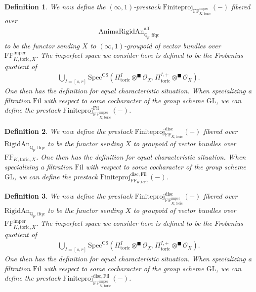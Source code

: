 \documentclass[12pt]{article}
\newtheorem{definition}{Definition}
\begin{document}
\begin{definition}
We now define the $(\infty,1)$-prestack $\mathrm{Finiteproj}_{\mathrm{FF}^\mathrm{imper}_{K,\mathrm{toric}}}(-)$ fibered over 
\begin{align}
\mathrm{AnimaRigidAn}^\mathrm{aff}_{\mathbb{Q}_p,\mathrm{ffqc}}
\end{align}
to be the functor sending $X$ to $(\infty,1)$-groupoid of vector bundles over $\mathrm{FF}^\mathrm{imper}_{K,\mathrm{toric},X}$. The imperfect space we consider here is defined to be the Frobenius quotient of
\begin{align}
\bigcup_{I=[s,r]}\mathrm{Spec}^\mathrm{CS}({\Pi}^I_{\mathrm{toric}}\otimes^\blacksquare \mathcal{O}_X,{\Pi}_{\mathrm{toric}}^{I,+}\otimes^\blacksquare \mathcal{O}_X).	
\end{align}
One then has the definition for equal characteristic situation. When specializing a filtration $\mathrm{Fil}$ with respect to some cocharacter of the group scheme $\mathrm{GL}$, we can define the prestack $\mathrm{Finiteproj}^{\mathrm{Fil}}_{\mathrm{FF}^\mathrm{imper}_{K,\mathrm{toric}}}(-)$.
\end{definition}

\begin{definition}
We now define the prestack $\mathrm{Finiteproj}^\mathrm{disc}_{\mathrm{FF}_{K,\mathrm{toric}}}(-)$ fibered over $\mathrm{RigidAn}_{\mathbb{Q}_p,\mathrm{ffqc}}$ to be the functor sending $X$ to groupoid of vector bundles over $\mathrm{FF}_{K,\mathrm{toric},X}$. One then has the definition for equal characteristic situation. When specializing a filtration $\mathrm{Fil}$ with respect to some cocharacter of the group scheme $\mathrm{GL}$, we can define the prestack $\mathrm{Finiteproj}^{\mathrm{disc},\mathrm{Fil}}_{\mathrm{FF}_{K,\mathrm{toric}}}(-)$.
\end{definition}


\begin{definition}
We now define the prestack $\mathrm{Finiteproj}^\mathrm{disc}_{\mathrm{FF}^\mathrm{imper}_{K,\mathrm{toric}}}(-)$ fibered over $\mathrm{RigidAn}_{\mathbb{Q}_p,\mathrm{ffqc}}$ to be the functor sending $X$ to groupoid of vector bundles over $\mathrm{FF}^\mathrm{imper}_{K,\mathrm{toric},X}$. The imperfect space we consider here is defined to be the Frobenius quotient of
\begin{align}
\bigcup_{I=[s,r]}\mathrm{Spec}^\mathrm{CS}({\Pi}^I_{\mathrm{toric}}\otimes^\blacksquare \mathcal{O}_X,{\Pi}_{\mathrm{toric}}^{I,+}\otimes^\blacksquare \mathcal{O}_X).	
\end{align}
One then has the definition for equal characteristic situation. When specializing a filtration $\mathrm{Fil}$ with respect to some cocharacter of the group scheme $\mathrm{GL}$, we can define the prestack $\mathrm{Finiteproj}^{\mathrm{disc},\mathrm{Fil}}_{\mathrm{FF}^\mathrm{imper}_{K,\mathrm{toric}}}(-)$.
\end{definition} 
\end{document}
